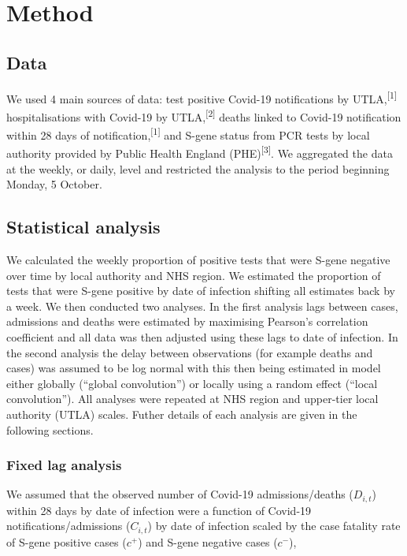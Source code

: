 \documentclass[
]{article}
\begin{document}
\hypertarget{method}{%
\section{Method}\label{method}}

\hypertarget{data}{%
\subsection{Data}\label{data}}

We used 4 main sources of data: test positive Covid-19 notifications by
UTLA,\textsuperscript{{[}1{]}} hospitalisations with Covid-19 by
UTLA,\textsuperscript{{[}2{]}} deaths linked to Covid-19 notification
within 28 days of notification,\textsuperscript{{[}1{]}} and S-gene
status from PCR tests by local authority provided by Public Health
England (PHE)\textsuperscript{{[}3{]}}. We aggregated the data at the
weekly, or daily, level and restricted the analysis to the period
beginning Monday, 5 October.

\hypertarget{statistical-analysis}{%
\subsection{Statistical analysis}\label{statistical-analysis}}

We calculated the weekly proportion of positive tests that were S-gene
negative over time by local authority and NHS region. We estimated the
proportion of tests that were S-gene positive by date of infection
shifting all estimates back by a week. We then conducted two analyses.
In the first analysis lags between cases, admissions and deaths were
estimated by maximising Pearson's correlation coefficient and all data
was then adjusted using these lags to date of infection. In the second
analysis the delay between observations (for example deaths and cases)
was assumed to be log normal with this then being estimated in model
either globally (``global convolution'') or locally using a random
effect (``local convolution''). All analyses were repeated at NHS region
and upper-tier local authority (UTLA) scales. Futher details of each
analysis are given in the following sections.

\hypertarget{fixed-lag-analysis}{%
\subsubsection{Fixed lag analysis}\label{fixed-lag-analysis}}

We assumed that the observed number of Covid-19 admissions/deaths
(\(D_{i,t}\)) within 28 days by date of infection were a function of
Covid-19 notifications/admissions (\(C_{i,t}\)) by date of infection
scaled by the case fatality rate of S-gene positive cases (\(c^+\)) and
S-gene negative cases (\(c^-\)),
\end{document}
